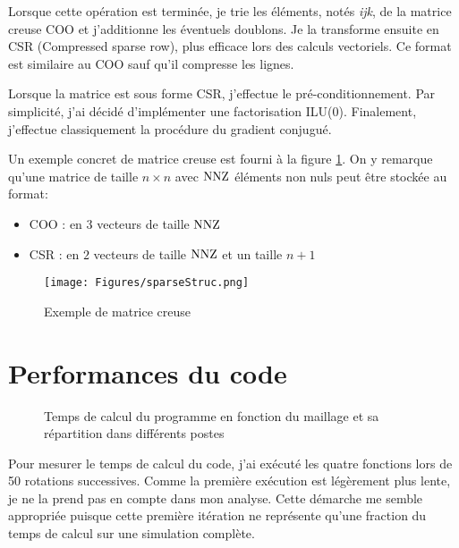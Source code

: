 \documentclass[11 pt]{article}
\begin{document}
Lorsque cette opération est terminée, je trie les éléments, notés \textit{ijk}, de la matrice creuse COO et j'additionne les éventuels doublons. Je la transforme ensuite en CSR (Compressed sparse row), plus efficace lors des calculs vectoriels. Ce format est similaire au COO sauf qu'il compresse les lignes.%

Lorsque la matrice est sous forme CSR, j'effectue le pré-conditionnement. Par simplicité, j'ai décidé d'implémenter une factorisation ILU(0). Finalement, j'effectue classiquement la procédure du gradient conjugué. %

Un exemple concret de matrice creuse est fourni à la figure \ref{sparse}. On y remarque qu'une matrice de taille $n \times n$ avec $\textrm{NNZ}$ éléments non nuls peut être stockée au format:
\begin{itemize}
    \item COO : en $3$ vecteurs de taille $\textrm{NNZ}$
    \item CSR : en $2$ vecteurs de taille $\textrm{NNZ}$ et un taille $n + 1$
\end{itemize}

\begin{figure}[!ht]
    \centering
    \texttt{[image: Figures/sparseStruc.png]}
    \caption{Exemple de matrice creuse}
    \label{sparse}
\end{figure}


\section{Performances du code}
\vspace{-0.2cm}

\begin{figure}[!h]
    \centering
    
    \caption{Temps de calcul du programme en fonction du maillage et sa répartition dans différents postes}
    \label{complexity}
\end{figure}

Pour mesurer le temps de calcul du code, j'ai exécuté les quatre fonctions lors de 50 rotations successives. Comme la première exécution est légèrement plus lente, je ne la prend pas en compte dans mon analyse. Cette démarche me semble appropriée puisque cette première itération ne représente qu'une fraction du temps de calcul sur une simulation complète.
\end{document}
